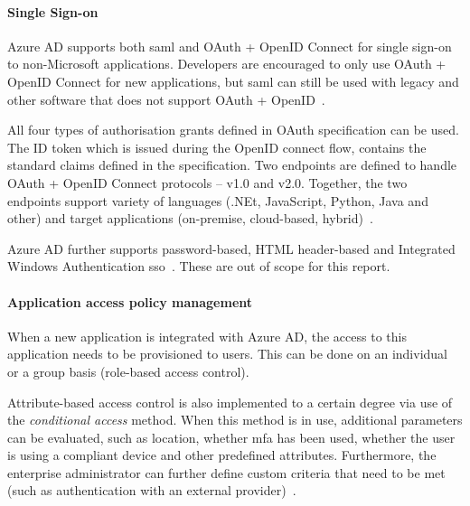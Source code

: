 
\paragraph{Single Sign-on} Azure AD supports both \acrshort{saml} and OAuth + OpenID Connect for single sign-on to non-Microsoft applications. Developers are encouraged to only use OAuth + OpenID Connect for new applications, but \acrshort{saml} can still be used with legacy and other software that does not support OAuth + OpenID~\cite{barbkess2019SingleApplications}. 

All four types of authorisation grants defined in OAuth specification can be used. The ID token which is issued during the OpenID connect flow, contains the standard claims defined in the specification. Two endpoints are defined to handle OAuth + OpenID Connect protocols -- v1.0 and v2.0. Together, the two endpoints support variety of languages (.NEt, JavaScript, Python, Java and other) and target applications (on-premise, cloud-based, hybrid)~\cite{deGuzman2018AboutPlatform}.

Azure AD further supports password-based, HTML header-based  and Integrated Windows Authentication \acrlong{sso}~\cite{barbkess2019SingleApplications}. These are out of scope for this report.

\paragraph{Application access policy management} When a new application is integrated with Azure AD, the access to this application needs to be provisioned to users. This can be done on an individual or a group basis (role-based access control). 

Attribute-based access control is also implemented to a certain degree via use of the \textit{conditional access} method. When this method is in use, additional parameters can be evaluated, such as location, whether \acrshort{mfa} has been used, whether the user is using a compliant device and other predefined attributes. Furthermore, the enterprise administrator can further define custom criteria that need to be met (such as authentication with an external provider)~\cite{Vilcinskas2019WhatAccess}.